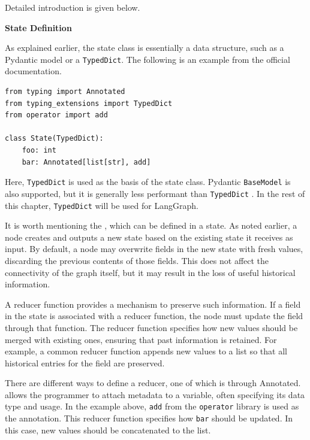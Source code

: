 Detailed introduction is given below.

\vspace{0.1in}
\noindent \textbf{State Definition}
\vspace{0.1in}

As explained earlier, the state class is essentially a data structure, such as a Pydantic model or a \texttt{TypedDict}. The following is an example from the official documentation.

\begin{lstlisting}
from typing import Annotated
from typing_extensions import TypedDict
from operator import add

class State(TypedDict):
    foo: int
    bar: Annotated[list[str], add]
\end{lstlisting}

Here, \texttt{TypedDict} is used as the basis of the state class. Pydantic \texttt{BaseModel} is also supported, but it is generally less performant than \texttt{TypedDict} \cite{langgraph2025compilingYourGraph}. In the rest of this chapter, \texttt{TypedDict} will be used for LangGraph.

It is worth mentioning the , which can be defined in a state. As noted earlier, a node creates and outputs a new state based on the existing state it receives as input. By default, a node may overwrite fields in the new state with fresh values, discarding the previous contents of those fields. This does not affect the connectivity of the graph itself, but it may result in the loss of useful historical information. 

A reducer function provides a mechanism to preserve such information. If a field in the state is associated with a reducer function, the node must update the field through that function. The reducer function specifies how new values should be merged with existing ones, ensuring that past information is retained. For example, a common reducer function appends new values to a list so that all historical entries for the field are preserved.

There are different ways to define a reducer, one of which is through Annotated.  allows the programmer to attach metadata to a variable, often specifying its data type and usage. In the example above, \texttt{add} from the \texttt{operator} library is used as the annotation. This reducer function specifies how \verb|bar| should be updated. In this case, new values should be concatenated to the list.

